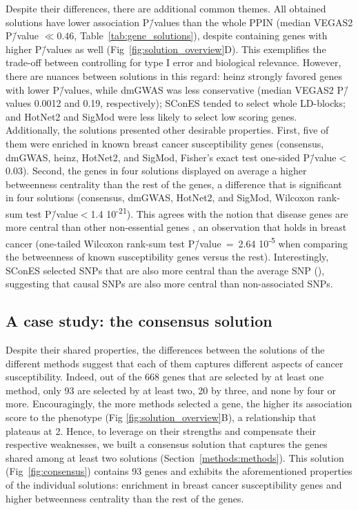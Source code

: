 \documentclass[10pt,letterpaper]{article}
\begin{document}
Despite their differences, there are additional common themes. All obtained solutions have lower association P\=/values than the whole PPIN (median VEGAS2 P\=/value $\ll 0.46$, Table~\ref{tab:gene_solutions}), despite containing genes with higher P\=/values as well (Fig~\ref{fig:solution_overview}D). This exemplifies the trade-off between controlling for type I error and biological relevance. However, there are nuances between solutions in this regard: heinz strongly favored genes with lower P\=/values, while dmGWAS was less conservative (median VEGAS2 P\=/values 0.0012 and 0.19, respectively); SConES tended to select whole LD-blocks; and HotNet2 and SigMod were less likely to select low scoring genes. Additionally, the solutions presented other desirable properties. First, five of them were enriched in known breast cancer susceptibility genes (consensus, dmGWAS, heinz, HotNet2, and SigMod, Fisher's exact test one-sided P\=/value$<$0.03). Second, the genes in four solutions displayed on average a higher betweenness centrality than the rest of the genes, a difference that is significant in four solutions (consensus, dmGWAS, HotNet2, and SigMod, Wilcoxon rank-sum test P\=/value$<$1.4 \texttimes{} 10\textsuperscript{-21}). This agrees with the notion that disease genes are more central than other non-essential genes \cite{pinero_uncovering_2016}, an observation that holds in breast cancer (one-tailed Wilcoxon rank-sum test P\=/value~=~2.64 \texttimes{} 10\textsuperscript{-5} when comparing the betweenness of known susceptibility genes versus the rest). Interestingly, SConES selected SNPs that are also more central than the average SNP (), suggesting that causal SNPs are also more central than non-associated SNPs.

\subsection{A case study: the consensus solution}
\label{results:consensus}

Despite their shared properties, the differences between the solutions of the different methods suggest that each of them captures different aspects of cancer susceptibility. Indeed, out of the 668 genes that are selected by at least one method, only 93 are selected by at least two, 20 by three, and none by four or more. Encouragingly, the more methods selected a gene, the higher its association score to the phenotype (Fig \ref{fig:solution_overview}B), a relationship that plateaus at 2. Hence, to leverage on their strengths and compensate their respective weaknesses, we built a consensus solution that captures the genes shared among at least two solutions (Section~\ref{methods:methods}). This solution (Fig~\ref{fig:consensus}) contains 93 genes and exhibits the aforementioned properties of the individual solutions: enrichment in breast cancer susceptibility genes and higher betweenness centrality than the rest of the genes. 
\end{document}
